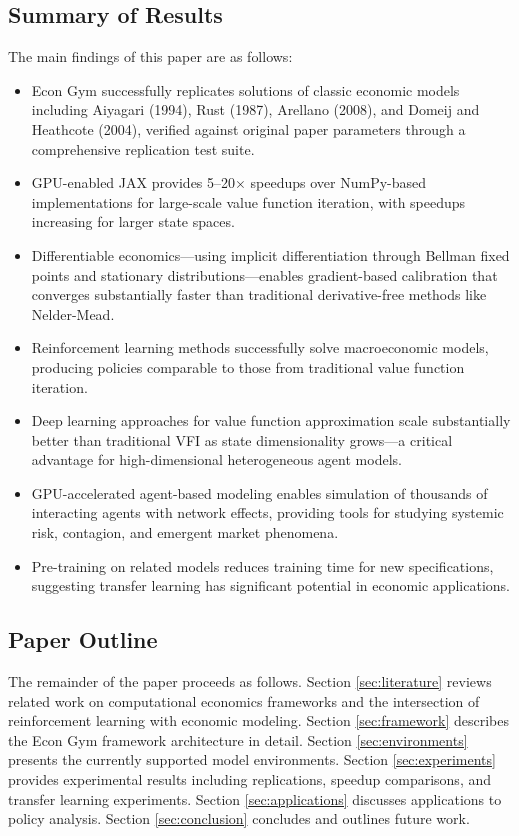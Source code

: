 \documentclass[12pt]{article}
\begin{document}
\subsection{Summary of Results}

The main findings of this paper are as follows:
\begin{itemize}
    \item Econ Gym successfully replicates solutions of classic economic models including Aiyagari (1994), Rust (1987), Arellano (2008), and Domeij and Heathcote (2004), verified against original paper parameters through a comprehensive replication test suite.
    \item GPU-enabled JAX provides 5--20$\times$ speedups over NumPy-based implementations for large-scale value function iteration, with speedups increasing for larger state spaces.
    \item Differentiable economics---using implicit differentiation through Bellman fixed points and stationary distributions---enables gradient-based calibration that converges substantially faster than traditional derivative-free methods like Nelder-Mead.
    \item Reinforcement learning methods successfully solve macroeconomic models, producing policies comparable to those from traditional value function iteration.
    \item Deep learning approaches for value function approximation scale substantially better than traditional VFI as state dimensionality grows---a critical advantage for high-dimensional heterogeneous agent models.
    \item GPU-accelerated agent-based modeling enables simulation of thousands of interacting agents with network effects, providing tools for studying systemic risk, contagion, and emergent market phenomena.
    \item Pre-training on related models reduces training time for new specifications, suggesting transfer learning has significant potential in economic applications.
\end{itemize}

\subsection{Paper Outline}

The remainder of the paper proceeds as follows. Section \ref{sec:literature} reviews related work on computational economics frameworks and the intersection of reinforcement learning with economic modeling. Section \ref{sec:framework} describes the Econ Gym framework architecture in detail. Section \ref{sec:environments} presents the currently supported model environments. Section \ref{sec:experiments} provides experimental results including replications, speedup comparisons, and transfer learning experiments. Section \ref{sec:applications} discusses applications to policy analysis. Section \ref{sec:conclusion} concludes and outlines future work.
\end{document}
